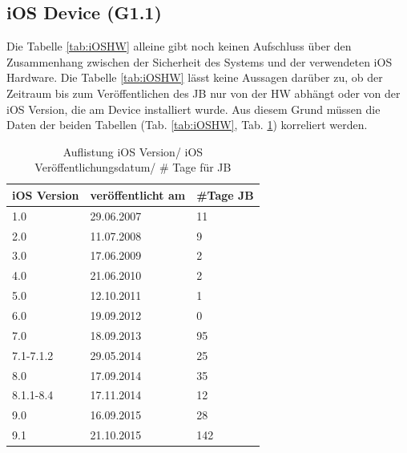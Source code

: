 \subsection{iOS Device (G1.1)}
\label{sec:Frage1iOSDevice} 

Die Tabelle \ref{tab:iOSHW} alleine gibt noch keinen Aufschluss über den Zusammenhang zwischen der Sicherheit des Systems und der verwendeten iOS Hardware. Die Tabelle \ref{tab:iOSHW} lässt keine Aussagen darüber zu, ob der Zeitraum bis zum Veröffentlichen des JB nur von der HW abhängt oder von der iOS Version, die am Device installiert wurde. Aus diesem Grund müssen die Daten der beiden Tabellen (Tab. \ref{tab:iOSHW}, Tab. \ref{tab:iOSVersion}) korreliert werden. \par 
\begin{table}[htp!]
    \begin{center}
        \begin{tabular}{|l|l|l|} \hline
         \textbf{iOS Version} & \textbf{veröffentlicht am} & \textbf{\#Tage JB}\\ \hline    
        1.0 & 29.06.2007 & 11\\ \hline 
        2.0 & 11.07.2008	& 9\\ \hline 
        3.0 & 17.06.2009	& 2\\ \hline 
        4.0 & 21.06.2010 & 2\\ \hline 
        5.0 & 12.10.2011	& 1\\ \hline 
        6.0 & 19.09.2012	& 0\\ \hline 
        7.0 & 18.09.2013	& 95\\ \hline 
        7.1-7.1.2 & 29.05.2014 & 25\\ \hline 
        8.0 & 17.09.2014	& 35\\ \hline 
        8.1.1-8.4 & 17.11.2014	& 12\\ \hline 
        9.0 & 16.09.2015	& 28\\ \hline
        9.1 & 21.10.2015	& 142\\ \hline 
        \end{tabular} 
        \caption{Auflistung iOS Version/ iOS Veröffentlichungsdatum/ \# Tage für JB \protect\footnotemark}
        \label{tab:iOSVersion}
    \end{center}
\end{table}

